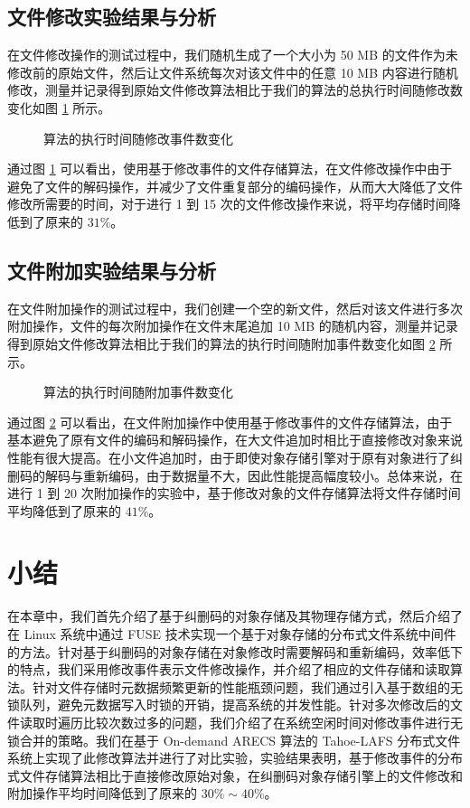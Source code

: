 \subsection{文件修改实验结果与分析}
在文件修改操作的测试过程中，我们随机生成了一个大小为 50 MB 的文件作为未修改前的原始文件，然后让文件系统每次对该文件中的任意 10 MB 内容进行随机修改，测量并记录得到原始文件修改算法相比于我们的算法的总执行时间随修改数变化如图 \ref{p18} 所示。

\begin{figure}[!htb]
\centering
\resizebox{.8\textwidth}{!}{}
\caption{算法的执行时间随修改事件数变化}
\label{p18}
\end{figure}

通过图 \ref{p18} 可以看出，使用基于修改事件的文件存储算法，在文件修改操作中由于避免了文件的解码操作，并减少了文件重复部分的编码操作，从而大大降低了文件修改所需要的时间，对于进行 1 到 15 次的文件修改操作来说，将平均存储时间降低到了原来的 $31\%$。
\subsection{文件附加实验结果与分析}
在文件附加操作的测试过程中，我们创建一个空的新文件，然后对该文件进行多次附加操作，文件的每次附加操作在文件末尾追加 10 MB 的随机内容，测量并记录得到原始文件修改算法相比于我们的算法的执行时间随附加事件数变化如图 \ref{p17} 所示。

\begin{figure}[!htb]
\centering
\resizebox{.8\textwidth}{!}{}
\caption{算法的执行时间随附加事件数变化}
\label{p17}
\end{figure}

通过图 \ref{p17} 可以看出，在文件附加操作中使用基于修改事件的文件存储算法，由于基本避免了原有文件的编码和解码操作，在大文件追加时相比于直接修改对象来说性能有很大提高。在小文件追加时，由于即使对象存储引擎对于原有对象进行了纠删码的解码与重新编码，由于数据量不大，因此性能提高幅度较小。总体来说，在进行 1 到 20 次附加操作的实验中，基于修改对象的文件存储算法将文件存储时间平均降低到了原来的 $41\%$。
\section{小结}
在本章中，我们首先介绍了基于纠删码的对象存储及其物理存储方式，然后介绍了在 Linux 系统中通过 FUSE 技术实现一个基于对象存储的分布式文件系统中间件的方法。针对基于纠删码的对象存储在对象修改时需要解码和重新编码，效率低下的特点，我们采用修改事件表示文件修改操作，并介绍了相应的文件存储和读取算法。针对文件存储时元数据频繁更新的性能瓶颈问题，我们通过引入基于数组的无锁队列，避免元数据写入时锁的开销，提高系统的并发性能。针对多次修改后的文件读取时遍历比较次数过多的问题，我们介绍了在系统空闲时间对修改事件进行无锁合并的策略。我们在基于 On-demand ARECS 算法的 Tahoe-LAFS 分布式文件系统上实现了此修改算法并进行了对比实验，实验结果表明，基于修改事件的分布式文件存储算法相比于直接修改原始对象，在纠删码对象存储引擎上的文件修改和附加操作平均时间降低到了原来的 $30\%\sim40\%$。
